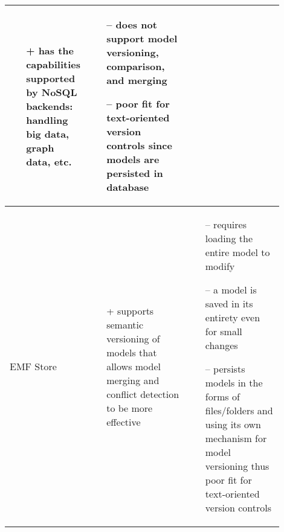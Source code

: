 \begin{table*}[]
\begin{scriptsize}
\begin{tabular}{
      |>{\centering\arraybackslash}m{0.1\linewidth}
      |>{\centering\arraybackslash}m{0.4\linewidth}
      |>{\centering\arraybackslash}m{0.4\linewidth}
      |}
\begin{minipage}[t]{\linewidth}
\begin{itemize}[leftmargin=7pt]
        \item[+] has the capabilities supported by NoSQL backends: handling big data, graph data, etc.
      \end{itemize}
    \end{minipage}
    &
    \begin{minipage}[t]{\linewidth}
      \raggedright
      \begin{itemize}[leftmargin=7pt]
        \setlength
        \item[--] does not support model versioning, comparison, and merging
        \item[--] poor fit for text-oriented version controls since models are persisted in database
      \end{itemize}
    \end{minipage} 
    \\
    \hline
    EMF Store
    &
    \begin{minipage}[t]{\linewidth}
      \raggedright
      \begin{itemize}[leftmargin=7pt]
        \setlength
        \item[+] supports semantic versioning of models that allows model merging and conflict detection to be more effective
      \end{itemize}
    \end{minipage}
    &
    \begin{minipage}[t]{\linewidth}
      \raggedright
      \begin{itemize}[leftmargin=7pt]
        \setlength
        \item[--] requires loading the entire model to modify
        \item[--] a model is saved in its entirety even for small changes
        \item[--] persists models in the forms of files/folders and using its own mechanism for model versioning thus poor fit for text-oriented version controls
      \end{itemize}
    \end{minipage} 
    \\
    \hline
  \end{tabular}
\end{scriptsize}
\end{table*}
  

